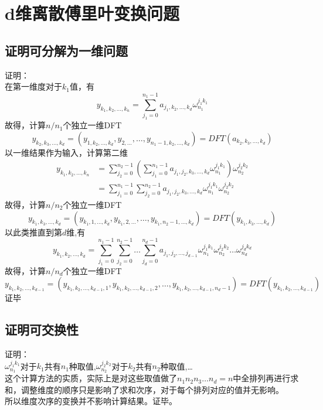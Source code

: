 \documentclass[cn,11pt,chinese]{elegantbook}
\begin{document}
\section{d维离散傅里叶变换问题}

\subsection{证明可分解为一维问题}
证明： \\
在第一维度对于$k_1$值，有
\begin{equation}
	y_{k_1,k_2,\dots ,k_n} = \sum_{j_1=0}^{n_1-1} a_{j_1,k_2,\dots ,k_d} \omega_{n_1}^{j_1k_1} \nonumber
\end{equation}
故得，计算$n/n_1$个独立一维DFT
\begin{equation}
	y_{k_2,k_3,\dots ,k_d}= (y_{1,k_2,\dots ,k_d},y_{2,\dots },\dots ,y_{n_1-1,k_2,\dots ,k_d}) = DFT(a_{k_2,k_3,\dots ,k_d}) \nonumber
\end{equation}
以一维结果作为输入，计算第二维
\begin{equation}
	\begin{aligned}
		y_{k_1,k_2,\dots ,k_n} &= \sum_{j_2=0}^{n_2-1} (\sum_{j_1=0}^{n_1-1} a_{j_1,j_2,k_3,\dots ,k_d} \omega_{n_1}^{j_1k_1}) \omega_{n_2}^{j_2k_2} \\
							&= \sum_{j_1=0}^{n_1-1} \sum_{j_2=0}^{n_2-1} a_{j_1,j_2,k_3,\dots ,k_d} \omega_{n_1}^{j_1k_1} \omega_{n_2}^{j_2k_2} 
	\end{aligned}
	\nonumber
\end{equation}
故得，计算$n/n_2$个独立一维DFT
\begin{equation}
	y_{k_1,k_3,\dots ,k_d}= (y_{k_1,1,\dots ,k_d},y_{k_1,2,\dots },\dots ,y_{k_1,n_2-1,\dots ,k_d}) = DFT(y_{k_1,k_3,\dots ,k_d}) \nonumber
\end{equation}
以此类推直到第$d$维,有
\begin{equation}
	y_{k_1,k_2,\dots ,k_d}= \sum_{j_1=0}^{n_1-1} \sum_{j_2=0}^{n_2-1} \dots \sum_{j_d=0}^{n_d-1} a_{j_1,j_2,\dots ,j_{d-1}} \omega_{n_1}^{j_1k_1} \omega_{n_2}^{j_2k_2} \dots \omega_{n_d}^{j_dk_d} \nonumber
\end{equation}
故得，计算$n/n_d$个独立一维DFT
\begin{equation}
	y_{k_1,k_2,\dots ,k_{d-1}}= (y_{k_1,k_2,\dots ,k_{d-1},1},y_{k_1,k_2,\dots ,k_{d-1},2},\dots ,y_{k_1,k_2,\dots ,k_{d-1},n_d-1}) = DFT(y_{k_1,k_2,\dots ,k_{d-1}}) \nonumber
\end{equation}
证毕

\subsection{证明可交换性}
证明： \\
$\omega_{n_1}^{j_1k_1}$对于$k_1$共有$n_1$种取值,$\omega_{n_2}^{j_2k_2}$对于$k_2$共有$n_2$种取值,\dots \\
这个计算方法的实质，实际上是对这些取值做了$n_1n_2n_3\dots n_d = n$中全排列再进行求和，调整维度的顺序只是影响了求和次序，对于每个排列对应的值并无影响。 \\
所以维度次序的变换并不影响计算结果。证毕。
\end{document}
